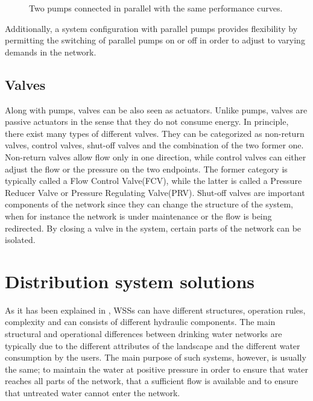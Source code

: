 \begin{figure}[H]
\centering
 
\caption{Two pumps connected in parallel with the same performance curves.}
\label{fig:parallelpumpcurve}
\end{figure}

\vspace{-3mm}

Additionally, a system configuration with parallel pumps provides flexibility by permitting the switching of parallel pumps on or off in order to adjust to varying demands in the network. 

\subsection{Valves}
\label{valves}

Along with pumps, valves can be also seen as actuators. Unlike pumps, valves are passive actuators in the sense that they do not consume energy. In principle, there exist many types of different valves. They can be categorized as non-return valves, control valves, shut-off valves and the combination of the two former one. Non-return valves allow flow only in one direction, while control valves can either adjust the flow or the pressure on the two endpoints. The former category is typically called a Flow Control Valve(FCV), while the latter is called a Pressure Reducer Valve or Pressure Regulating Valve(PRV). Shut-off valves are important components of the network since they can change the structure of the system, when for instance the network is under maintenance or the flow is being redirected. By closing a valve in the system, certain parts of the network can be isolated.

\section{Distribution system solutions}
\label{distribution_system_solutions}

As it has been explained in , WSSs can have different structures, operation rules, complexity and can consists of different hydraulic components. The main structural and operational differences between drinking water networks are typically due to the different attributes of the landscape and the different water consumption by the users. The main purpose of such systems, however, is usually the same; to maintain the water at positive pressure in order to ensure that water reaches all parts of the network, that a sufficient flow is available and to ensure that untreated water cannot enter the network. 


